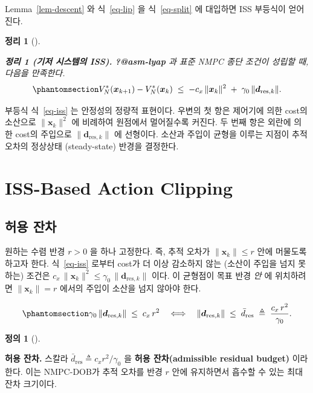 \documentclass[
  11pt,
]{article}
\theoremstyle{plain}
\theoremstyle{plain}
\newtheorem{theorem}{정리}[section]
\theoremstyle{definition}
\newtheorem{definition}{정의}[section]
\theoremstyle{remark}
\begin{document}
Lemma~\ref{lem-descent} 와 식~\ref{eq-lip} 을 식~\ref{eq-split} 에
대입하면 ISS 부등식이 얻어진다.

\begin{theorem}[]\protect\hypertarget{thm-baseline-iss}{}\label{thm-baseline-iss}

\textbf{정리 1 (기저 시스템의 ISS).} \textbf{?@asm-lyap} 과 표준 NMPC
종단 조건이 성립할 때, 다음을 만족한다.
\begin{equation}\protect\phantomsection\label{eq-iss}{
V_N^*(\bm{x}_{k+1}) - V_N^*(\bm{x}_k)
\;\le\;
-c_x\,\|\bm{x}_k\|^2
\;+\; \gamma_0\,\|\bm{d}_{\mathrm{res},k}\|.
}\end{equation}

\end{theorem}

부등식 식~\ref{eq-iss} 는 안정성의 정량적 표현이다. 우변의 첫 항은
제어기에 의한 cost의 소산으로 \(\|\bm{x}_k\|^2\) 에 비례하여 원점에서
멀어질수록 커진다. 두 번째 항은 외란에 의한 cost의 주입으로
\(\|\bm{d}_{\mathrm{res},k}\|\) 에 선형이다. 소산과 주입이 균형을 이루는
지점이 추적 오차의 정상상태 (steady-state) 반경을 결정한다.

\section{ISS-Based Action Clipping}\label{sec-clip}

\subsection{허용 잔차}\label{sec-budget}

원하는 수렴 반경 \(r > 0\) 을 하나 고정한다. 즉, 추적 오차가
\(\|\bm{x}_k\| \le r\) 안에 머물도록 하고자 한다. 식~\ref{eq-iss} 로부터
cost가 더 이상 감소하지 않는 (소산이 주입을 넘지 못하는) 조건은
\(c_x\,\|\bm{x}_k\|^2 \le \gamma_0\,\|\bm{d}_{\mathrm{res},k}\|\) 이다.
이 균형점이 목표 반경 \emph{안} 에 위치하려면 \(\|\bm{x}_k\|=r\) 에서의
주입이 소산을 넘지 않아야 한다.

\begin{equation}\protect\phantomsection\label{eq-budget}{
\gamma_0\,\|\bm{d}_{\mathrm{res},k}\| \;\le\; c_x\,r^2
\quad\Longleftrightarrow\quad
\|\bm{d}_{\mathrm{res},k}\| \;\le\; \bar{d}_{\mathrm{res}}
\;\triangleq\; \frac{c_x\,r^2}{\gamma_0}.
}\end{equation}

\begin{definition}[]\protect\hypertarget{def-budget}{}\label{def-budget}

\textbf{허용 잔차.} 스칼라
\(\bar{d}_{\mathrm{res}} \triangleq c_x r^2 / \gamma_0\) 을 \textbf{허용
잔차(admissible residual budget)} 이라 한다. 이는 NMPC-DOB가 추적 오차를
반경 \(r\) 안에 유지하면서 흡수할 수 있는 최대 잔차 크기이다.

\end{definition}
\end{document}
